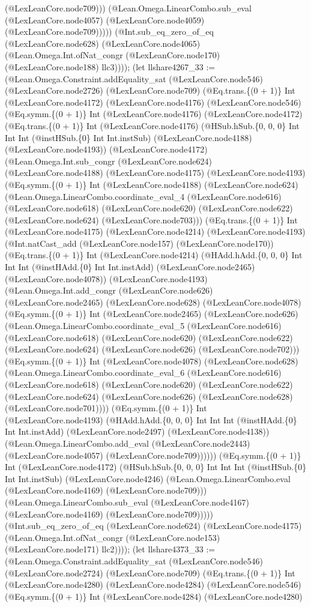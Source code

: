 \documentclass[11pt]{article}
\begin{document}
(@LexLeanCore.node709))) (@Lean.Omega.LinearCombo.sub\_eval (@LexLeanCore.node4057) (@LexLeanCore.node4059) (@LexLeanCore.node709))))) (@Int.sub\_eq\_zero\_of\_eq (@LexLeanCore.node628) (@LexLeanCore.node4065) (@Lean.Omega.Int.ofNat\_congr (@LexLeanCore.node170) (@LexLeanCore.node188) llc3)))); (let llshare4267\_33 := (@Lean.Omega.Constraint.addEquality\_sat (@LexLeanCore.node546) (@LexLeanCore.node2726) (@LexLeanCore.node709) (@Eq.trans.\{(0 + 1)\} Int (@LexLeanCore.node4172) (@LexLeanCore.node4176) (@LexLeanCore.node546) (@Eq.symm.\{(0 + 1)\} Int (@LexLeanCore.node4176) (@LexLeanCore.node4172) (@Eq.trans.\{(0 + 1)\} Int (@LexLeanCore.node4176) (@HSub.hSub.\{0, 0, 0\} Int Int Int (@instHSub.\{0\} Int Int.instSub) (@LexLeanCore.node4188) (@LexLeanCore.node4193)) (@LexLeanCore.node4172) (@Lean.Omega.Int.sub\_congr (@LexLeanCore.node624) (@LexLeanCore.node4188) (@LexLeanCore.node4175) (@LexLeanCore.node4193) (@Eq.symm.\{(0 + 1)\} Int (@LexLeanCore.node4188) (@LexLeanCore.node624) (@Lean.Omega.LinearCombo.coordinate\_eval\_4 (@LexLeanCore.node616) (@LexLeanCore.node618) (@LexLeanCore.node620) (@LexLeanCore.node622) (@LexLeanCore.node624) (@LexLeanCore.node703))) (@Eq.trans.\{(0 + 1)\} Int (@LexLeanCore.node4175) (@LexLeanCore.node4214) (@LexLeanCore.node4193) (@Int.natCast\_add (@LexLeanCore.node157) (@LexLeanCore.node170)) (@Eq.trans.\{(0 + 1)\} Int (@LexLeanCore.node4214) (@HAdd.hAdd.\{0, 0, 0\} Int Int Int (@instHAdd.\{0\} Int Int.instAdd) (@LexLeanCore.node2465) (@LexLeanCore.node4078)) (@LexLeanCore.node4193) (@Lean.Omega.Int.add\_congr (@LexLeanCore.node626) (@LexLeanCore.node2465) (@LexLeanCore.node628) (@LexLeanCore.node4078) (@Eq.symm.\{(0 + 1)\} Int (@LexLeanCore.node2465) (@LexLeanCore.node626) (@Lean.Omega.LinearCombo.coordinate\_eval\_5 (@LexLeanCore.node616) (@LexLeanCore.node618) (@LexLeanCore.node620) (@LexLeanCore.node622) (@LexLeanCore.node624) (@LexLeanCore.node626) (@LexLeanCore.node702))) (@Eq.symm.\{(0 + 1)\} Int (@LexLeanCore.node4078) (@LexLeanCore.node628) (@Lean.Omega.LinearCombo.coordinate\_eval\_6 (@LexLeanCore.node616) (@LexLeanCore.node618) (@LexLeanCore.node620) (@LexLeanCore.node622) (@LexLeanCore.node624) (@LexLeanCore.node626) (@LexLeanCore.node628) (@LexLeanCore.node701)))) (@Eq.symm.\{(0 + 1)\} Int (@LexLeanCore.node4193) (@HAdd.hAdd.\{0, 0, 0\} Int Int Int (@instHAdd.\{0\} Int Int.instAdd) (@LexLeanCore.node2497) (@LexLeanCore.node4138)) (@Lean.Omega.LinearCombo.add\_eval (@LexLeanCore.node2443) (@LexLeanCore.node4057) (@LexLeanCore.node709)))))) (@Eq.symm.\{(0 + 1)\} Int (@LexLeanCore.node4172) (@HSub.hSub.\{0, 0, 0\} Int Int Int (@instHSub.\{0\} Int Int.instSub) (@LexLeanCore.node4246) (@Lean.Omega.LinearCombo.eval (@LexLeanCore.node4169) (@LexLeanCore.node709))) (@Lean.Omega.LinearCombo.sub\_eval (@LexLeanCore.node4167) (@LexLeanCore.node4169) (@LexLeanCore.node709))))) (@Int.sub\_eq\_zero\_of\_eq (@LexLeanCore.node624) (@LexLeanCore.node4175) (@Lean.Omega.Int.ofNat\_congr (@LexLeanCore.node153) (@LexLeanCore.node171) llc2)))); (let llshare4373\_33 := (@Lean.Omega.Constraint.addEquality\_sat (@LexLeanCore.node546) (@LexLeanCore.node2724) (@LexLeanCore.node709) (@Eq.trans.\{(0 + 1)\} Int (@LexLeanCore.node4280) (@LexLeanCore.node4284) (@LexLeanCore.node546) (@Eq.symm.\{(0 + 1)\} Int (@LexLeanCore.node4284) (@LexLeanCore.node4280) 
\end{document}

